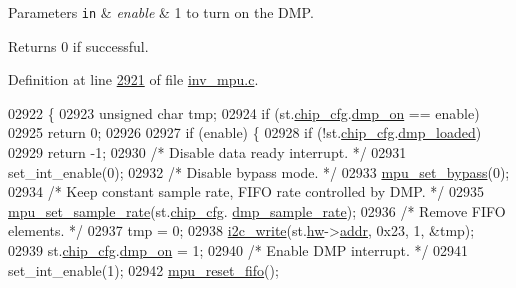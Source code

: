\begin{DoxyParams}[1]{Parameters}
\mbox{\tt in}  & {\em enable} & 1 to turn on the D\+MP. \\
\hline
\end{DoxyParams}
\begin{DoxyReturn}{Returns}
0 if successful. 
\end{DoxyReturn}


Definition at line \hyperlink{inv__mpu_8c_source_l02921}{2921} of file \hyperlink{inv__mpu_8c_source}{inv\+\_\+mpu.\+c}.


\begin{DoxyCode}
02922 \{
02923     \textcolor{keywordtype}{unsigned} \textcolor{keywordtype}{char} tmp;
02924     \textcolor{keywordflow}{if} (st.\hyperlink{structgyro__state__s_ac895217592e2084bd520b0be8e9d20ee}{chip\_cfg}.\hyperlink{structchip__cfg__s_a49fb51079238683b21264827348b5968}{dmp\_on} == enable)
02925         \textcolor{keywordflow}{return} 0;
02926 
02927     \textcolor{keywordflow}{if} (enable) \{
02928         \textcolor{keywordflow}{if} (!st.\hyperlink{structgyro__state__s_ac895217592e2084bd520b0be8e9d20ee}{chip\_cfg}.\hyperlink{structchip__cfg__s_afc32c3e58317c589014257dc9b1ee04b}{dmp\_loaded})
02929             \textcolor{keywordflow}{return} -1;
02930         \textcolor{comment}{/* Disable data ready interrupt. */}
02931         set\_int\_enable(0);
02932         \textcolor{comment}{/* Disable bypass mode. */}
02933         \hyperlink{group___d_r_i_v_e_r_s_ga36f70f38371b48d81094d3b061233e15}{mpu\_set\_bypass}(0);
02934         \textcolor{comment}{/* Keep constant sample rate, FIFO rate controlled by DMP. */}
02935         \hyperlink{group___d_r_i_v_e_r_s_ga0144d666a67a82888b8580002afe8b55}{mpu\_set\_sample\_rate}(st.\hyperlink{structgyro__state__s_ac895217592e2084bd520b0be8e9d20ee}{chip\_cfg}.
      \hyperlink{structchip__cfg__s_a5d17c6049cc8cb74faf5cdb942988294}{dmp\_sample\_rate});
02936         \textcolor{comment}{/* Remove FIFO elements. */}
02937         tmp = 0;
02938         \hyperlink{_i2_c_8c_ac0f145afe8d662af199043939f4398d6}{i2c\_write}(st.\hyperlink{structgyro__state__s_a5bac30a96752691e4cc723735060e360}{hw}->\hyperlink{structhw__s_a4c34a946600e9d68b6355d23f54d291b}{addr}, 0x23, 1, &tmp);
02939         st.\hyperlink{structgyro__state__s_ac895217592e2084bd520b0be8e9d20ee}{chip\_cfg}.\hyperlink{structchip__cfg__s_a49fb51079238683b21264827348b5968}{dmp\_on} = 1;
02940         \textcolor{comment}{/* Enable DMP interrupt. */}
02941         set\_int\_enable(1);
02942         \hyperlink{group___d_r_i_v_e_r_s_gaf23e9f57c0059be6ec57862f0584de10}{mpu\_reset\_fifo}();

\end{DoxyCode}
